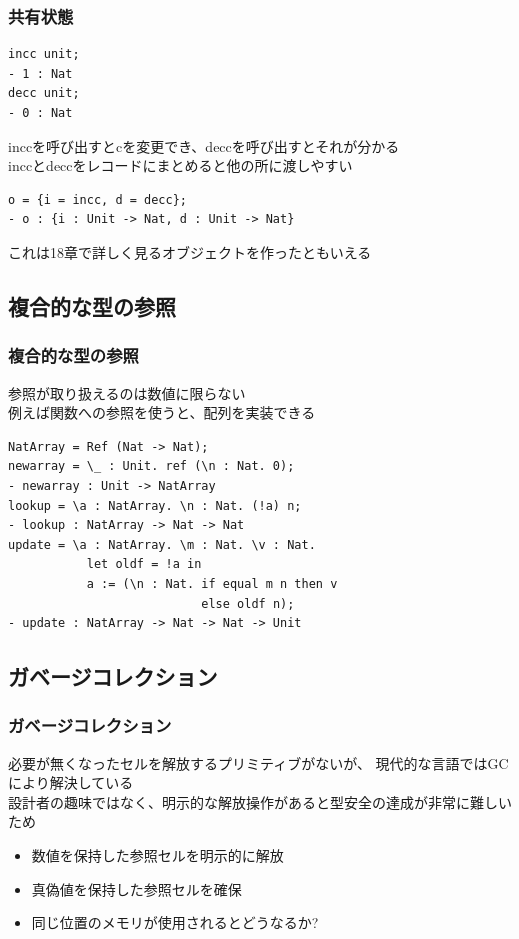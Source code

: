 \documentclass[dvipdfmx,cjk,xcolor=dvipsnames,envcountsect,notheorems]{beamer}
\theoremstyle{definition}
\begin{document}
\begin{frame}[fragile]
	\frametitle{共有状態}
	\Large
\begin{lstlisting}
incc unit;
- 1 : Nat
decc unit;
- 0 : Nat
\end{lstlisting}
	inccを呼び出すとcを変更でき、deccを呼び出すとそれが分かる\\
	inccとdeccをレコードにまとめると他の所に渡しやすい
\begin{lstlisting}
o = {i = incc, d = decc};
- o : {i : Unit -> Nat, d : Unit -> Nat}
\end{lstlisting}
	これは18章で詳しく見るオブジェクトを作ったともいえる
\end{frame}

\subsection{複合的な型の参照}

\begin{frame}[fragile]
	\frametitle{複合的な型の参照}
	\Large 参照が取り扱えるのは数値に限らない\\
	例えば関数への参照を使うと、配列を実装できる
\begin{lstlisting}
NatArray = Ref (Nat -> Nat);
newarray = \_ : Unit. ref (\n : Nat. 0);
- newarray : Unit -> NatArray
lookup = \a : NatArray. \n : Nat. (!a) n;
- lookup : NatArray -> Nat -> Nat
update = \a : NatArray. \m : Nat. \v : Nat.
           let oldf = !a in
           a := (\n : Nat. if equal m n then v
                           else oldf n);
- update : NatArray -> Nat -> Nat -> Unit
\end{lstlisting}
\end{frame}

\subsection{ガベージコレクション}

\begin{frame}
	\frametitle{ガベージコレクション}
	\Large 必要が無くなったセルを解放するプリミティブがないが、
	現代的な言語ではGCにより解決している\\
	設計者の趣味ではなく、明示的な解放操作があると型安全の達成が非常に難しいため
	\vfill
	\begin{itemize}
		\item 数値を保持した参照セルを明示的に解放
		\item 真偽値を保持した参照セルを確保
		\item 同じ位置のメモリが使用されるとどうなるか?
	\end{itemize}
\end{frame}
\end{document}
